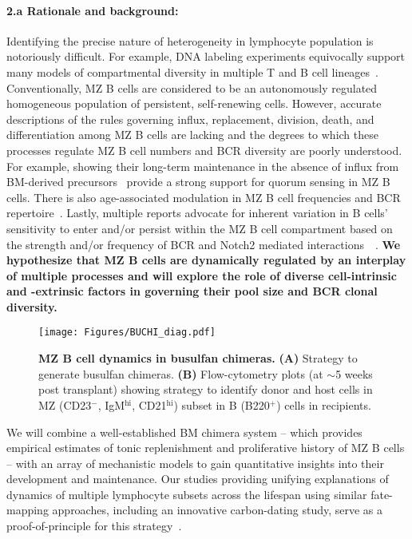 \documentclass[11pt]{article}
\newcommand{\para}[1]{\vspace*{-4.5mm}\paragraph{#1}}
\newcommand{\red}[1]{{\color{red}{#1}}}
\begin{document}
\para{{2.a Rationale and background:}}
Identifying the precise nature of heterogeneity in lymphocyte population is notoriously difficult. For example, DNA labeling experiments equivocally support many models of compartmental diversity in multiple  T and B cell lineages~\red{(CITEs)}.
Conventionally, MZ B cells are considered to be an autonomously regulated homogeneous population of persistent, self-renewing cells. 
However, accurate descriptions of the rules governing influx, replacement, division, death, and differentiation among MZ B cells are lacking and the degrees to which these processes regulate MZ B cell numbers and BCR diversity are poorly understood. 
For example,  showing their long-term maintenance in the absence of influx from BM-derived precursors~\cite{Carvalho_2001, Hao_2001} provide a strong support for quorum sensing in MZ B cells.   
There is also age-associated modulation in MZ B cell frequencies and BCR repertoire~\cite{Birjandi_2011, Cortegano_2017}.
Lastly, multiple reports advocate for inherent variation in B cells' sensitivity to enter and/or persist within the MZ B cell compartment based on the strength and/or frequency of BCR and Notch2 mediated interactions~~\red{(CITEs)}. %
\textbf{We hypothesize that MZ B cells are dynamically regulated by an interplay of multiple processes and will explore the role of diverse cell-intrinsic and -extrinsic factors in governing their pool size and BCR clonal diversity.
}


\begin{wrapfigure}{r}{0.42\textwidth}
\centering
\vspace*{-4mm}
\texttt{[image: Figures/BUCHI\_diag.pdf]}
\vspace*{-6mm}
\caption{\textbf{MZ B cell dynamics in busulfan chimeras.}
\textbf{(A)} Strategy to generate busulfan chimeras.
\textbf{(B)} Flow-cytometry plots (at $\sim$5 weeks post transplant) showing strategy to identify donor and host cells in MZ (CD23$^-$, IgM$^\text{hi}$, CD21$^\text{hi}$) subset in B (B220$^+$) cells in recipients.%
}
\label{fig:BUCHI}
\vspace*{-7mm}
\end{wrapfigure}

We will combine a well-established BM chimera system -- which provides empirical estimates of tonic replenishment and proliferative history of MZ B cells -- with an array of mechanistic models to gain quantitative insights into their development and maintenance.
Our studies providing unifying explanations of dynamics of multiple lymphocyte subsets across the lifespan using similar fate-mapping approaches, including an innovative carbon-dating study, serve as a proof-of-principle for this strategy~\cite{Rane_2018, Mold_2019, Verheijen_2020, Rane_2022}.
\end{document}
